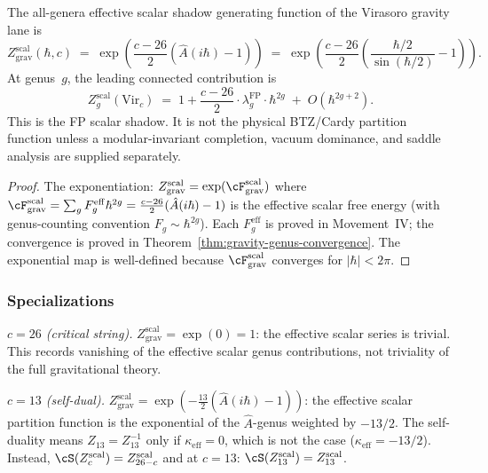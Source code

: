 \begin{theorem}
\label{thm:gravity-partition-function-explicit}
The all-genera effective scalar shadow generating function of the
Virasoro gravity lane is
\begin{equation}\label{eq:gravity-Z-explicit}
Z_{\mathrm{grav}}^{\mathrm{scal}}(\hbar, c)
\;=\;
\exp\!\left(
 \frac{c-26}{2}\left(\hat A(i\hbar) - 1\right)
\right)
\;=\;
\exp\!\left(
 \frac{c-26}{2}
 \left(
 \frac{\hbar/2}{\sin(\hbar/2)} - 1
 \right)
\right).
\end{equation}
At genus~$g$, the leading connected contribution is
\[
Z_g^{\mathrm{scal}}(\mathrm{Vir}_c)
\;=\;
1 + \frac{c-26}{2}\cdot\lambda_g^{\mathrm{FP}}
 \cdot\hbar^{2g}
\;+\; O(\hbar^{2g+2}).
\]
This is the FP scalar shadow. It is not the physical BTZ/Cardy
partition function unless a modular-invariant completion, vacuum
dominance, and saddle analysis are supplied separately.
\end{theorem}

\begin{proof}
The exponentiation: $Z_{\mathrm{grav}}^{\mathrm{scal}}
= \exp(\cF_{\mathrm{grav}}^{\mathrm{scal}})$ where
$\cF_{\mathrm{grav}}^{\mathrm{scal}}
= \sum_g F_g^{\mathrm{eff}} \hbar^{2g}
= \frac{c-26}{2}(\hat A(i\hbar) - 1)$ is the effective scalar free
energy (with genus-counting convention
$F_g \sim \hbar^{2g}$). Each $F_g^{\mathrm{eff}}$ is proved in Movement~IV; the
convergence is proved in
Theorem~\ref{thm:gravity-genus-convergence}. The
exponential map is well-defined because
$\cF_{\mathrm{grav}}^{\mathrm{scal}}$ converges for
$|\hbar| < 2\pi$.
\end{proof}

\subsubsection*{Specializations}

\emph{$c = 26$ (critical string).}\enspace
$Z_{\mathrm{grav}}^{\mathrm{scal}} = \exp(0) = 1$: the effective
scalar series is trivial. This records vanishing of the effective
scalar genus contributions, not triviality of the full gravitational
theory.

\emph{$c = 13$ (self-dual).}\enspace
$Z_{\mathrm{grav}}^{\mathrm{scal}}
= \exp\!\left(-\frac{13}{2}(\hat A(i\hbar) - 1)\right)$:
the effective scalar partition function is the exponential of the $\hat A$-genus
weighted by $-13/2$. The self-duality means
$Z_{13} = Z_{13}^{-1}$ only if $\kappa_{\mathrm{eff}} = 0$,
which is not the case ($\kappa_{\mathrm{eff}} = -13/2$).
Instead, $\cS(Z_c^{\mathrm{scal}}) = Z_{26-c}^{\mathrm{scal}}$ and at $c = 13$:
$\cS(Z_{13}^{\mathrm{scal}}) = Z_{13}^{\mathrm{scal}}$.

